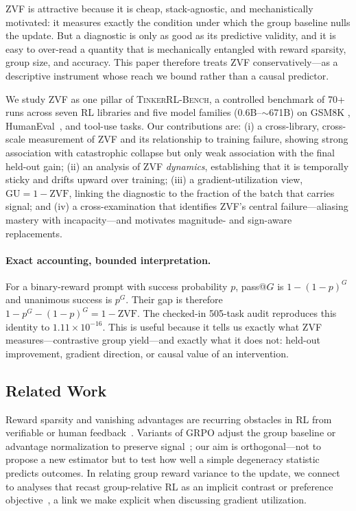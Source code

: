 \documentclass{article}
\newcommand{\ours}{\textsc{TinkerRL-Bench}}
\begin{document}
ZVF is attractive because it is cheap, stack-agnostic, and mechanistically
motivated: it measures exactly the condition under which the group baseline nulls
the update. But a diagnostic is only as good as its predictive validity, and it is
easy to over-read a quantity that is mechanically entangled with reward sparsity,
group size, and accuracy. This paper therefore treats ZVF conservatively---as a
descriptive instrument whose reach we bound rather than a causal predictor.

We study ZVF as one pillar of \ours{}, a controlled benchmark of 70+ runs across
seven RL libraries and five model families ($0.6$B--$\sim$671B) on GSM8K
\citep{cobbe2021training}, HumanEval~\citep{chen2021codex}, and tool-use tasks.
Our contributions are: (i) a cross-library, cross-scale measurement of ZVF and its
relationship to training failure, showing strong association with catastrophic
collapse but only weak association with the final held-out gain; (ii) an analysis
of ZVF \emph{dynamics}, establishing that it is temporally sticky and drifts upward
over training; (iii) a gradient-utilization view, $\mathrm{GU} = 1 - \mathrm{ZVF}$,
linking the diagnostic to the fraction of the batch that carries signal; and (iv) a
cross-examination that identifies ZVF's central failure---aliasing mastery with
incapacity---and motivates magnitude- and sign-aware replacements.

\paragraph{Exact accounting, bounded interpretation.}
For a binary-reward prompt with success probability $p$, pass@$G$ is
$1-(1-p)^G$ and unanimous success is $p^G$. Their gap is therefore
$1-p^G-(1-p)^G=1-\mathrm{ZVF}$. The checked-in 505-task audit reproduces this
identity to $1.11\times10^{-16}$. This is useful because it tells us exactly
what ZVF measures---contrastive group yield---and exactly what it does not:
held-out improvement, gradient direction, or causal value of an intervention.

\subsection{Related Work}
\label{sec:p2-related}
Reward sparsity and vanishing advantages are recurring obstacles in RL from
verifiable or human feedback~\citep{christiano2017deeprlhf, ouyang2022training, ahmadian2024backtobasics}. Variants of GRPO adjust the group baseline or advantage
normalization to preserve signal~\citep{lin2025cppo, gift2025, liu2025rlsubnetworks};
our aim is orthogonal---not to propose a new estimator but to test how well a
simple degeneracy statistic predicts outcomes. In relating group reward variance
to the update, we connect to analyses that recast group-relative RL as an implicit
contrast or preference objective~\citep{wu2025grpo_dpo, liu2026gdpo}, a link we make
explicit when discussing gradient utilization.
\end{document}
